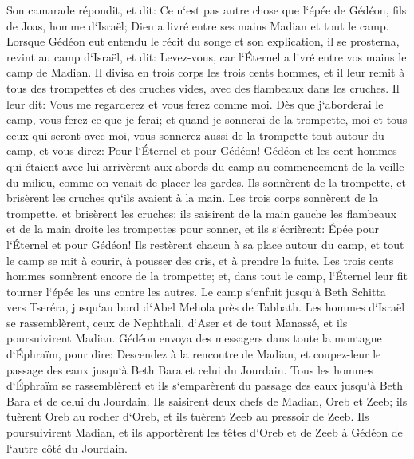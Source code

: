 \verse Son camarade répondit, et dit: Ce n`est pas autre chose que l`épée de Gédéon, fils de Joas, homme d`Israël; Dieu a livré entre ses mains Madian et tout le camp. 
\verse Lorsque Gédéon eut entendu le récit du songe et son explication, il se prosterna, revint au camp d`Israël, et dit: Levez-vous, car l`Éternel a livré entre vos mains le camp de Madian. 
\verse Il divisa en trois corps les trois cents hommes, et il leur remit à tous des trompettes et des cruches vides, avec des flambeaux dans les cruches. 
\verse Il leur dit: Vous me regarderez et vous ferez comme moi. Dès que j`aborderai le camp, vous ferez ce que je ferai; 
\verse et quand je sonnerai de la trompette, moi et tous ceux qui seront avec moi, vous sonnerez aussi de la trompette tout autour du camp, et vous direz: Pour l`Éternel et pour Gédéon! 
\verse Gédéon et les cent hommes qui étaient avec lui arrivèrent aux abords du camp au commencement de la veille du milieu, comme on venait de placer les gardes. Ils sonnèrent de la trompette, et brisèrent les cruches qu`ils avaient à la main. 
\verse Les trois corps sonnèrent de la trompette, et brisèrent les cruches; ils saisirent de la main gauche les flambeaux et de la main droite les trompettes pour sonner, et ils s`écrièrent: Épée pour l`Éternel et pour Gédéon! 
\verse Ils restèrent chacun à sa place autour du camp, et tout le camp se mit à courir, à pousser des cris, et à prendre la fuite. 
\verse Les trois cents hommes sonnèrent encore de la trompette; et, dans tout le camp, l`Éternel leur fit tourner l`épée les uns contre les autres. Le camp s`enfuit jusqu`à Beth Schitta vers Tseréra, jusqu`au bord d`Abel Mehola près de Tabbath. 
\verse Les hommes d`Israël se rassemblèrent, ceux de Nephthali, d`Aser et de tout Manassé, et ils poursuivirent Madian. 
\verse Gédéon envoya des messagers dans toute la montagne d`Éphraïm, pour dire: Descendez à la rencontre de Madian, et coupez-leur le passage des eaux jusqu`à Beth Bara et celui du Jourdain. Tous les hommes d`Éphraïm se rassemblèrent et ils s`emparèrent du passage des eaux jusqu`à Beth Bara et de celui du Jourdain. 
\verse Ils saisirent deux chefs de Madian, Oreb et Zeeb; ils tuèrent Oreb au rocher d`Oreb, et ils tuèrent Zeeb au pressoir de Zeeb. Ils poursuivirent Madian, et ils apportèrent les têtes d`Oreb et de Zeeb à Gédéon de l`autre côté du Jourdain. 

